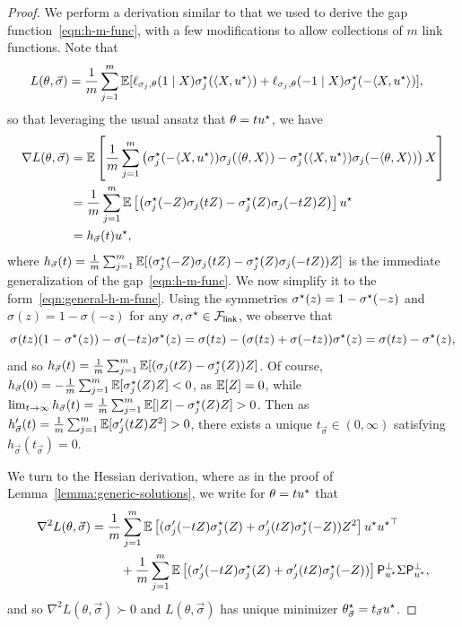 \begin{proof}
	We perform a derivation similar to that we used
	to derive the gap function~\eqref{eqn:h-m-func}, with a few
	modifications to allow collections of $m$ link functions.
	Note that
	\begin{align*}
		L(\theta, \vec{\sigma})
		& = \frac{1}{m} \sum_{j = 1}^m
		\mathbb{E}[\ell_{\sigma_j, \theta}(1 \mid X) \sigma^\star_j(\langle X, u^\star\rangle)
		+ \ell_{\sigma_j,\theta}(-1 \mid X) \sigma^\star_j(-\langle X, u^\star\rangle)],
	\end{align*}
	so that leveraging the usual ansatz that $\theta = t u^\star$, we have
	\begin{align*}
		\nabla L(\theta, \vec{\sigma})
		& = \mathbb{E}\left[\frac{1}{m}
		\sum_{j = 1}^m \left(\sigma^\star_j(-\langle X, u^\star\rangle) \sigma_j(\langle\theta, X\rangle)
		- \sigma^\star_j(\langle X, u^\star\rangle) \sigma_j(-\langle\theta, X\rangle)\right) X \right] \\
		& = \frac{1}{m} \sum_{j = 1}^m
		\mathbb{E}\left[\left(\sigma_j^\star(-Z) \sigma_j(t Z)
		- \sigma_j^\star(Z) \sigma_j(-tZ) Z\right)\right] u^\star \\
		& = h_{\vec{\sigma}}(t) u^\star,
	\end{align*}
	where $h_{\vec{\sigma}}(t) = \frac{1}{m} \sum_{j = 1}^m
	\mathbb{E}[(\sigma_j^\star(-Z) \sigma_j(tZ) - \sigma_j^\star(Z) \sigma_j(-tZ)) Z]$ is
	the immediate generalization of the gap~\eqref{eqn:h-m-func}. We
	now simplify it to the form~\eqref{eqn:general-h-m-func}. Using the
	symmetries $\sigma^\star(z) = 1 - \sigma^\star(-z)$ and $\sigma(z) = 1 -
	\sigma(-z)$ for any $\sigma, \sigma^\star \in \mathcal{F}_{\mathsf{link}}$, we observe that
	\begin{equation*}
		\sigma(tz) (1 - \sigma^\star(z))
		- \sigma(-tz) \sigma^\star(z)
		= \sigma(tz) - (\sigma(tz) + \sigma(-tz)) \sigma^\star(z)
		= \sigma(tz) - \sigma^\star(z),
	\end{equation*}
	and so
	$h_{\vec{\sigma}}(t) = \frac{1}{m} \sum_{j = 1}^m\mathbb{E}[(\sigma_j(tZ) -
	\sigma_j^\star(Z))Z]$.
	Of course, $h_{\vec{\sigma}}(0) = -\frac{1}{m}
	\sum_{j = 1}^m \mathbb{E}[\sigma_j^\star(Z) Z] < 0$, as $\mathbb{E}[Z] = 0$, while
	$\lim_{t \to \infty} h_{\vec{\sigma}}(t) =
	\frac{1}{m} \sum_{j = 1}^m \mathbb{E}[|Z| - \sigma_j^\star(Z) Z] > 0$.
	Then as $h_{\vec{\sigma}}'(t) =
	\frac{1}{m} \sum_{j = 1}^m \mathbb{E}[\sigma_j'(tZ) Z^2] > 0$, there
	exists a unique $t_{\vec{\sigma}} \in (0, \infty)$ satisfying
	$h_{\vec{\sigma}}(t_{\vec{\sigma}}) = 0$.
	
	We turn to the Hessian derivation, where as in the proof of
	Lemma~\ref{lemma:generic-solutions}, we
	write for $\theta = tu^\star$ that
	\begin{align*}
		\nabla^2 L(\theta, \vec{\sigma})
		& = \frac{1}{m} \sum_{j = 1}^m \mathbb{E}\left[
		(\sigma_j'(-t Z) \sigma^\star_j(Z)
		+ \sigma_j'(tZ) \sigma^\star_j(-Z)) Z^2\right] u^\star{u^\star}^\top \\
		& \qquad ~ +
		\frac{1}{m} \sum_{j = 1}^m \mathbb{E}\left[
		(\sigma_j'(-t Z) \sigma^\star_j(Z)
		+ \sigma_j'(tZ) \sigma^\star_j(-Z))\right] \mathsf{P}_{u^\star}^\perp \Sigma
		\mathsf{P}_{u^\star}^\perp,
	\end{align*}
	and so $\nabla^2 L(\theta, \vec{\sigma}) \succ 0$ and $L(\theta,
	\vec{\sigma})$ has unique minimizer $\theta_{\vec{\sigma}}^\star =
	t_{\vec{\sigma}} u^\star$.
\end{proof}

